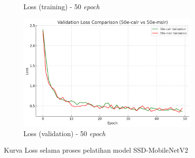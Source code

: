 \begin{figure}[htbp]
\begin{subfigure}{0.45\textwidth}
    \caption{Loss (training) - 50 \emph{epoch}}
  \end{subfigure}
  \hfill
  \begin{subfigure}{0.45\textwidth}
    \includegraphics[width=\textwidth]{gambar/bab4-val-loss-50e.png}
    \caption{Loss (validation) - 50 \emph{epoch}}
  \end{subfigure}
  \caption{Kurva Loss selama proses pelatihan model SSD-MobileNetV2}
  \label{fig:loss_curves}
\end{figure}

